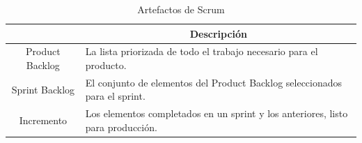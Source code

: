 \begin{table}[H]
    \centering
    \caption{Artefactos de Scrum}
    \label{tab:artefactos}
    \begin{tabular}{|c|m{}|}
    \hline
    \rowcolor{gray!50}
    \multicolumn{1}{|c|}{\textbf{Artefacto}} & \multicolumn{1}{c|}{\textbf{Descripción}} \\
    \hline
    Product Backlog & La lista priorizada de todo el trabajo necesario para el producto.\\
    \hline
    Sprint Backlog & El conjunto de elementos del Product Backlog seleccionados para el sprint.\\
    \hline
    Incremento & Los elementos completados en un sprint y los anteriores, listo para producción.\\
    \hline
    \end{tabular}
\end{table}